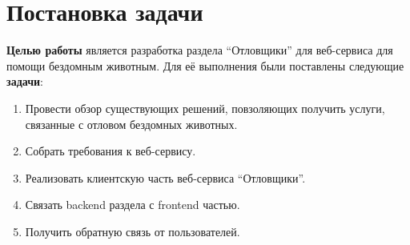 
\section{Постановка задачи}
\label{sec:task}
\textbf{Целью работы} является разработка раздела \enquote{Отловщики} для веб-сервиса для помощи бездомным животным.
Для её выполнения были поставлены следующие \textbf{задачи}:
\begin{enumerate}
    \item Провести обзор существующих решений, повзоляющих получить услуги, связанные с отловом бездомных животных.
    \item Собрать требования к веб-сервису.
    \item Реализовать клиентскую часть веб-сервиса \enquote{Отловщики}.
    \item Связать backend раздела с frontend частью.
    \item Получить обратную связь от пользователей.
\end{enumerate}
